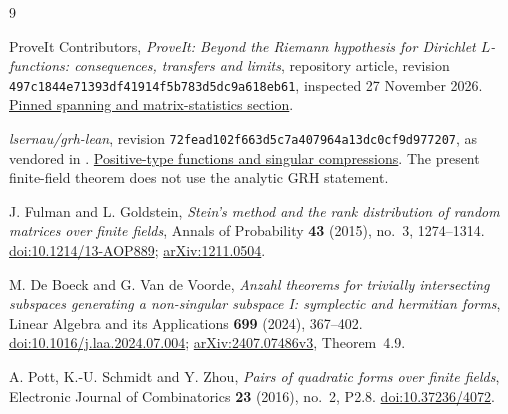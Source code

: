 \documentclass[11pt]{article}
\theoremstyle{definition}
\newcommand{\gitsha}{\texttt{497c1844e71393df41914f5b783d5dc9a618eb61}}
\begin{document}
\begin{thebibliography}{9}
\raggedright
{}
ProveIt Contributors, \emph{ProveIt: Beyond the Riemann hypothesis for Dirichlet
\(L\)-functions: consequences, transfers and limits}, repository article,
revision \gitsha, inspected 27 November 2026.
\href{https://github.com/VladimirReshetnikov/ProveIt/blob/497c1844e71393df41914f5b783d5dc9a618eb61/Analysis/GeneralizedRiemannHypothesis/Article/sections/spn.tex}{Pinned spanning and matrix-statistics section}.

\emph{lsernau/grh-lean}, revision
\texttt{72fead102f663d5c7a407964a13dc0cf9d977207},
as vendored in \cite{ProveIt}.
\href{https://github.com/VladimirReshetnikov/ProveIt/blob/497c1844e71393df41914f5b783d5dc9a618eb61/Analysis/GeneralizedRiemannHypothesis/vendor/grh-lean/grh/src/New/Spanning/SecondMoment/PositiveType.lean}{Positive-type functions and singular compressions}.
The present finite-field theorem does not use the analytic GRH statement.

J. Fulman and L. Goldstein,
\emph{Stein's method and the rank distribution of random matrices over finite fields},
Annals of Probability \textbf{43} (2015), no.~3, 1274--1314.
\href{https://doi.org/10.1214/13-AOP889}{doi:10.1214/13-AOP889};
\href{https://arxiv.org/abs/1211.0504}{arXiv:1211.0504}.

M. De Boeck and G. Van de Voorde,
\emph{Anzahl theorems for trivially intersecting subspaces generating a
non-singular subspace I: symplectic and hermitian forms},
Linear Algebra and its Applications \textbf{699} (2024), 367--402.
\href{https://doi.org/10.1016/j.laa.2024.07.004}{doi:10.1016/j.laa.2024.07.004};
\href{https://arxiv.org/html/2407.07486v3}{arXiv:2407.07486v3}, Theorem~4.9.

A. Pott, K.-U. Schmidt and Y. Zhou,
\emph{Pairs of quadratic forms over finite fields},
Electronic Journal of Combinatorics \textbf{23} (2016), no.~2, P2.8.
\href{https://doi.org/10.37236/4072}{doi:10.37236/4072}.
\end{thebibliography}
\end{document}

